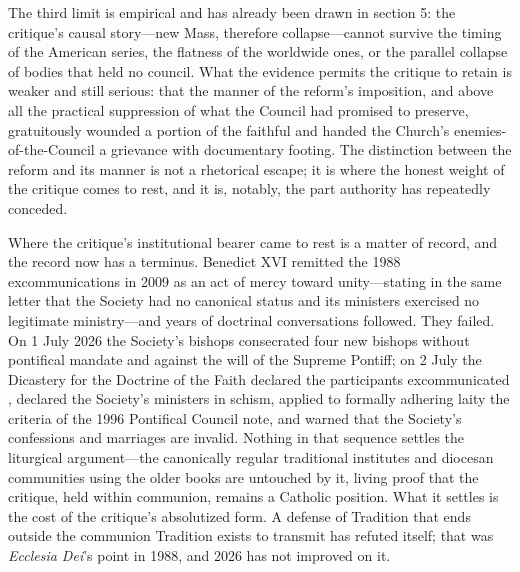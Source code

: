 The third limit is empirical and has already been drawn in section 5: the critique's causal story---new Mass, therefore collapse---cannot survive the timing of the American series, the flatness of the worldwide ones, or the parallel collapse of bodies that held no council. What the evidence permits the critique to retain is weaker and still serious: that the manner of the reform's imposition, and above all the practical suppression of what the Council had promised to preserve, gratuitously wounded a portion of the faithful and handed the Church's enemies-of-the-Council a grievance with documentary footing. The distinction between the reform and its manner is not a rhetorical escape; it is where the honest weight of the critique comes to rest, and it is, notably, the part authority has repeatedly conceded.

Where the critique's institutional bearer came to rest is a matter of record, and the record now has a terminus. Benedict XVI remitted the 1988 excommunications in 2009 as an act of mercy toward unity---stating in the same letter that the Society had no canonical status and its ministers exercised no legitimate ministry---and years of doctrinal conversations followed. They failed. On 1 July 2026 the Society's bishops consecrated four new bishops without pontifical mandate and against the will of the Supreme Pontiff; on 2 July the Dicastery for the Doctrine of the Faith declared the participants excommunicated , declared the Society's ministers in schism, applied to formally adhering laity the criteria of the 1996 Pontifical Council note, and warned that the Society's confessions and marriages are invalid. Nothing in that sequence settles the liturgical argument---the canonically regular traditional institutes and diocesan communities using the older books are untouched by it, living proof that the critique, held within communion, remains a Catholic position. What it settles is the cost of the critique's absolutized form. A defense of Tradition that ends outside the communion Tradition exists to transmit has refuted itself; that was \emph{Ecclesia Dei}'s point in 1988, and 2026 has not improved on it.
